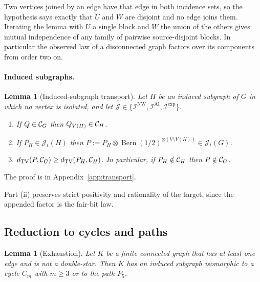 \documentclass[11pt]{article}
\theoremstyle{plain}
\newtheorem{lemma}[theorem]{Lemma}
\theoremstyle{definition}
\DeclareMathOperator{\Bern}{Bern}
\DeclareMathOperator{\TV}{TV}
\newcommand{\INW}{\mathcal I^{\mathrm{NW}}}
\newcommand{\IAI}{\mathcal I^{\mathrm{AI}}}
\newcommand{\Iexp}{\mathcal I^{\mathrm{exp}}}
\begin{document}
Two vertices joined by an edge have that edge in both incidence sets, so the hypothesis says exactly that $U$ and $W$ are disjoint and no edge joins them. Iterating the lemma with $U$ a single block and $W$ the union of the others gives mutual independence of any family of pairwise source-disjoint blocks. In particular the observed law of a disconnected graph factors over its components from order two on.

\paragraph{Induced subgraphs.}

\begin{lemma}[Induced-subgraph transport]\label{lem:transport}
Let $H$ be an induced subgraph of $G$ in which no vertex is isolated, and let $\mathcal J\in\{\INW,\IAI,\Iexp\}$.
\begin{enumerate}[label=(\roman*),nosep]
\item If $Q\in\mathcal C_{G}$ then $Q_{V(H)}\in\mathcal C_{H}$.
\item If $P_H\in\mathcal J_t(H)$ then $P:=P_H\otimes\Bern(1/2)^{\otimes(V\setminus V(H))}\in\mathcal J_t(G)$.
\item $d_{\TV}(P,\Cscen{G})\ge d_{\TV}(P_H,\Cscen{H})$. In particular, if $P_H\notin\mathcal C_{H}$ then $P\notin\mathcal C_{G}$.
\end{enumerate}
\end{lemma}

The proof is in Appendix~\ref{app:transport}.

Part (ii) preserves strict positivity and rationality of the target, since the appended factor is the fair-bit law.

\subsection{Reduction to cycles and paths}

\begin{lemma}[Exhaustion]\label{lem:exhaustion}
Let $K$ be a finite connected graph that has at least one edge and is not a double-star. Then $K$ has an induced subgraph isomorphic to a cycle $C_m$ with $m\ge3$ or to the path $P_5$.
\end{lemma}
\end{document}

